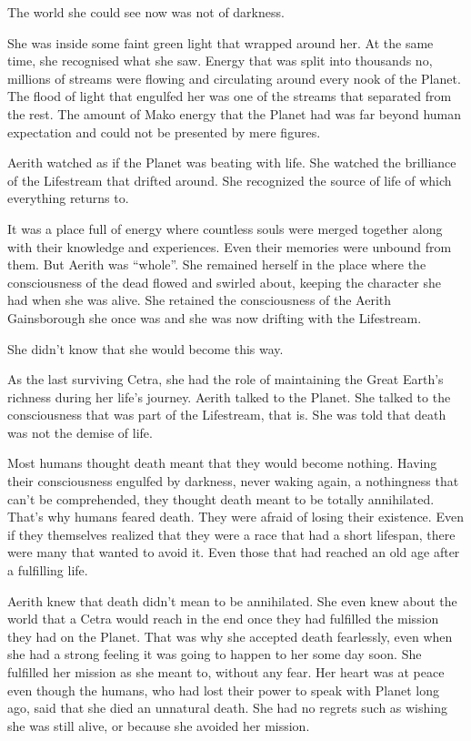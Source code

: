 \documentclass[oneside]{book}
\begin{document}
The world she could see now was not of darkness.

She was inside some faint green light that wrapped around her. At the same time, she recognised what she saw. Energy that was split into thousands no, millions of streams were flowing and circulating around every nook of the Planet. The flood of light that engulfed her was one of the streams that separated from the rest. The amount of Mako energy that the Planet had was far beyond human expectation and could not be presented by mere figures.

Aerith watched as if the Planet was beating with life. She watched the brilliance of the Lifestream that drifted around. She recognized the source of life of which everything returns to.

It was a place full of energy where countless souls were merged together along with their knowledge and experiences. Even their memories were unbound from them. But Aerith was “whole”. She remained herself in the place where the consciousness of the dead flowed and swirled about, keeping the character she had when she was alive. She retained the consciousness of the Aerith Gainsborough she once was and she was now drifting with the Lifestream.

She didn't know that she would become this way.

As the last surviving Cetra, she had the role of maintaining the Great Earth's richness during her life's journey. Aerith talked to the Planet. She talked to the consciousness that was part of the Lifestream, that is. She was told that death was not the demise of life.

Most humans thought death meant that they would become nothing. Having their consciousness engulfed by darkness, never waking again, a nothingness that can't be comprehended, they thought death meant to be totally annihilated. That's why humans feared death. They were afraid of losing their existence. Even if they themselves realized that they were a race that had a short lifespan, there were many that wanted to avoid it. Even those that had reached an old age after a fulfilling life.

Aerith knew that death didn't mean to be annihilated. She even knew about the world that a Cetra would reach in the end once they had fulfilled the mission they had on the Planet. That was why she accepted death fearlessly, even when she had a strong feeling it was going to happen to her some day soon. She fulfilled her mission as she meant to, without any fear. Her heart was at peace even though the humans, who had lost their power to speak with Planet long ago, said that she died an unnatural death. She had no regrets such as wishing she was still alive, or because she avoided her mission.
\end{document}
